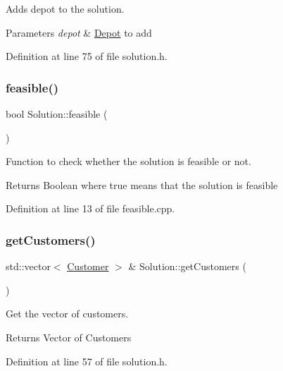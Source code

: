 Adds depot to the solution. 
\begin{DoxyParams}{Parameters}
{\em depot} & \hyperlink{class_depot}{Depot} to add \\
\hline
\end{DoxyParams}


Definition at line 75 of file solution.\+h.

\mbox{\label{class_solution_a13e4ebdccdbc8c572a82fb21254022d0}} 
\subsubsection{\texorpdfstring{feasible()}{feasible()}}
{\footnotesize\ttfamily bool Solution\+::feasible (\begin{DoxyParamCaption}{ }\end{DoxyParamCaption})}



Function to check whether the solution is feasible or not. 

\begin{DoxyReturn}{Returns}
Boolean where true means that the solution is feasible 
\end{DoxyReturn}


Definition at line 13 of file feasible.\+cpp.

\mbox{\label{class_solution_a535607b6b1cfd652f783c18f742be458}} 
\subsubsection{\texorpdfstring{get\+Customers()}{getCustomers()}}
{\footnotesize\ttfamily std\+::vector$<$ \hyperlink{class_customer}{Customer} $>$ \& Solution\+::get\+Customers (\begin{DoxyParamCaption}{ }\end{DoxyParamCaption})\hspace{0.3cm}{\ttfamily [inline]}}

Get the vector of customers. \begin{DoxyReturn}{Returns}
Vector of Customers 
\end{DoxyReturn}


Definition at line 57 of file solution.\+h.

